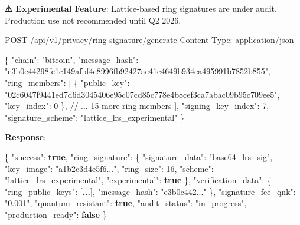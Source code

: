 \documentclass[
  11pt,
]{article}
\newenvironment{Shaded}{\begin{snugshade}}{\end{snugshade}}
\newcommand{\DataTypeTok}[1]{\textcolor[rgb]{0.13,0.29,0.53}{#1}}
\newcommand{\DecValTok}[1]{\textcolor[rgb]{0.00,0.00,0.81}{#1}}
\newcommand{\ErrorTok}[1]{\textcolor[rgb]{0.64,0.00,0.00}{\textbf{#1}}}
\newcommand{\FunctionTok}[1]{\textcolor[rgb]{0.00,0.00,0.00}{#1}}
\newcommand{\KeywordTok}[1]{\textcolor[rgb]{0.13,0.29,0.53}{\textbf{#1}}}
\newcommand{\NormalTok}[1]{#1}
\newcommand{\OtherTok}[1]{\textcolor[rgb]{0.56,0.35,0.01}{#1}}
\newcommand{\StringTok}[1]{\textcolor[rgb]{0.31,0.60,0.02}{#1}}
\begin{document}
\textbf{⚠️ Experimental Feature}: Lattice-based ring signatures are
under audit. Production use not recommended until Q2 2026.

\begin{Shaded}
\begin{Highlighting}[]
\NormalTok{POST /api/v1/privacy/ring{-}signature/generate}
\NormalTok{Content{-}Type: application/json}

\NormalTok{\{}
\NormalTok{  "chain": "bitcoin",}
\NormalTok{  "message\_hash": "e3b0c44298fc1c149afbf4c8996fb92427ae41e4649b934ca495991b7852b855",}
\NormalTok{  "ring\_members": [}
\NormalTok{    \{}
\NormalTok{      "public\_key": "02c6047f9441ed7d6d3045406e95c07cd85c778e4b8cef3ca7abac09b95c709ee5",}
\NormalTok{      "key\_index": 0}
\NormalTok{    \},}
\NormalTok{    // ... 15 more ring members}
\NormalTok{  ],}
\NormalTok{  "signing\_key\_index": 7,}
\NormalTok{  "signature\_scheme": "lattice\_lrs\_experimental"}
\NormalTok{\}}
\end{Highlighting}
\end{Shaded}

\textbf{Response}:

\begin{Shaded}
\begin{Highlighting}[]
\FunctionTok{\{}
  \DataTypeTok{"success"}\FunctionTok{:} \KeywordTok{true}\FunctionTok{,}
  \DataTypeTok{"ring\_signature"}\FunctionTok{:} \FunctionTok{\{}
    \DataTypeTok{"signature\_data"}\FunctionTok{:} \StringTok{"base64\_lrs\_sig"}\FunctionTok{,}
    \DataTypeTok{"key\_image"}\FunctionTok{:} \StringTok{"a1b2c3d4e5f6..."}\FunctionTok{,}
    \DataTypeTok{"ring\_size"}\FunctionTok{:} \DecValTok{16}\FunctionTok{,}
    \DataTypeTok{"scheme"}\FunctionTok{:} \StringTok{"lattice\_lrs\_experimental"}\FunctionTok{,}
    \DataTypeTok{"experimental"}\FunctionTok{:} \KeywordTok{true}
  \FunctionTok{\},}
  \DataTypeTok{"verification\_data"}\FunctionTok{:} \FunctionTok{\{}
    \DataTypeTok{"ring\_public\_keys"}\FunctionTok{:} \OtherTok{[}\ErrorTok{...}\OtherTok{]}\FunctionTok{,}
    \DataTypeTok{"message\_hash"}\FunctionTok{:} \StringTok{"e3b0c442..."}
  \FunctionTok{\},}
  \DataTypeTok{"signature\_fee\_qnk"}\FunctionTok{:} \StringTok{"0.001"}\FunctionTok{,}
  \DataTypeTok{"quantum\_resistant"}\FunctionTok{:} \KeywordTok{true}\FunctionTok{,}
  \DataTypeTok{"audit\_status"}\FunctionTok{:} \StringTok{"in\_progress"}\FunctionTok{,}
  \DataTypeTok{"production\_ready"}\FunctionTok{:} \KeywordTok{false}
\FunctionTok{\}}
\end{Highlighting}
\end{Shaded}
\end{document}
